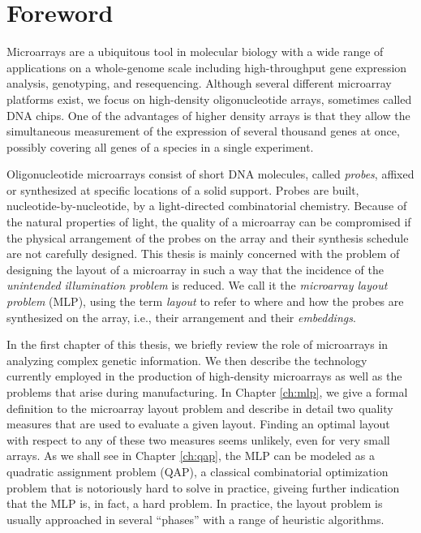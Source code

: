 \chapter*{Foreword}

Microarrays are a ubiquitous tool in molecular biology with a wide range of
applications on a whole-genome scale including high-throughput gene expression
analysis, genotyping, and resequencing. Although several different microarray
platforms exist, we focus on high-density oligonucleotide arrays, sometimes
called DNA chips. One of the advantages of higher density arrays is that they
allow the simultaneous measurement of the expression of several thousand genes
at once, possibly covering all genes of a species in a single experiment.

Oligonucleotide microarrays consist of short DNA molecules, called
\emph{probes}, affixed or synthesized at specific locations of a solid support.
Probes are built, nucleotide-by-nucleotide, by a light-directed combinatorial
chemistry. Because of the natural properties of light, the quality of a
microarray can be compromised if the physical arrangement of the probes on the
array and their synthesis schedule are not carefully designed. This thesis is
mainly concerned with the problem of designing the layout of a microarray in
such a way that the incidence of the \emph{unintended illumination problem} is
reduced. We call it the \emph{microarray layout problem} (MLP), using the term
\emph{layout} to refer to where and how the probes are synthesized on the array,
i.e., their arrangement and their \emph{embeddings}.

In the first chapter of this thesis, we briefly review the role of microarrays
in analyzing complex genetic information. We then describe the technology
currently employed in the production of high-density microarrays as well as the
problems that arise during manufacturing. In Chapter \ref{ch:mlp}, we give a
formal definition to the microarray layout problem and describe in detail two
quality measures that are used to evaluate a given layout. Finding an optimal
layout with respect to any of these two measures seems unlikely, even for very
small arrays. As we shall see in Chapter \ref{ch:qap}, the MLP can be modeled as
a quadratic assignment problem (QAP), a classical combinatorial optimization
problem that is notoriously hard to solve in practice, giveing further
indication that the MLP is, in fact, a hard problem. In practice, the layout
problem is usually approached in several ``phases'' with a range of heuristic
algorithms.


